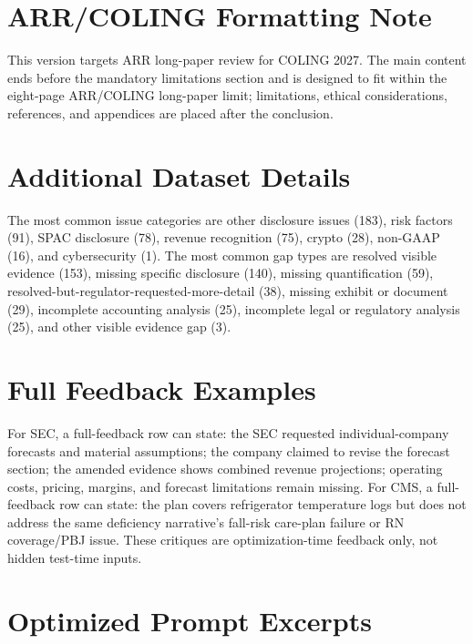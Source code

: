 \documentclass[11pt]{article}
\begin{document}


\appendix

\section{ARR/COLING Formatting Note}

This version targets ARR long-paper review for COLING 2027. The main content ends before the mandatory limitations section and is designed to fit within the eight-page ARR/COLING long-paper limit; limitations, ethical considerations, references, and appendices are placed after the conclusion.

\section{Additional Dataset Details}
\label{app:data}

The most common issue categories are other disclosure issues (183), risk factors (91), SPAC disclosure (78), revenue recognition (75), crypto (28), non-GAAP (16), and cybersecurity (1). The most common gap types are resolved visible evidence (153), missing specific disclosure (140), missing quantification (59), resolved-but-regulator-requested-more-detail (38), missing exhibit or document (29), incomplete accounting analysis (25), incomplete legal or regulatory analysis (25), and other visible evidence gap (3).

\section{Full Feedback Examples}
\label{app:feedback}

For SEC, a full-feedback row can state: the SEC requested individual-company forecasts and material assumptions; the company claimed to revise the forecast section; the amended evidence shows combined revenue projections; operating costs, pricing, margins, and forecast limitations remain missing. For CMS, a full-feedback row can state: the plan covers refrigerator temperature logs but does not address the same deficiency narrative's fall-risk care-plan failure or RN coverage/PBJ issue. These critiques are optimization-time feedback only, not hidden test-time inputs.

\section{Optimized Prompt Excerpts}
\label{app:prompts}
\end{document}
